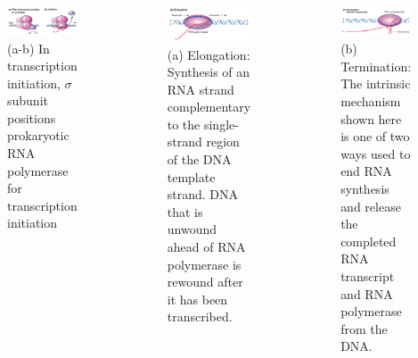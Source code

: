 \documentclass[11pt,ignorenonframetext,aspectratio=169]{beamer}
\begin{document}
\begin{frame}{}
\protect\hypertarget{section-23}{}
\begin{columns}[T,onlytextwidth]


\begin{figure}
\includegraphics[width=0.8\linewidth]{../images/gene_transcription_prokaryotes1} \caption{(a-b) In transcription initiation, $\sigma$ subunit positions prokaryotic RNA polymerase for transcription initiation}\label{fig:gene-transcription-prokaryotes1}
\end{figure}

  
\begin{figure}
\includegraphics[width=0.75\linewidth]{../images/gene_transcription_prokaryotes2} \caption{(a) Elongation: Synthesis of an RNA strand complementary to the single-strand region of the DNA template strand. DNA that is unwound ahead of RNA polymerase is rewound after it has been transcribed.}\label{fig:gene-transcription-prokaryotes2}
\end{figure}


\begin{figure}
\includegraphics[width=0.75\linewidth]{../images/gene_transcription_prokaryotes3} \caption{(b) Termination: The intrinsic mechanism shown here is one of two ways used to end RNA synthesis and release the completed RNA transcript and RNA polymerase from the DNA.}\label{fig:gene-transcription-prokaryotes3}
\end{figure}

\end{columns}
\end{frame}
\end{document}
